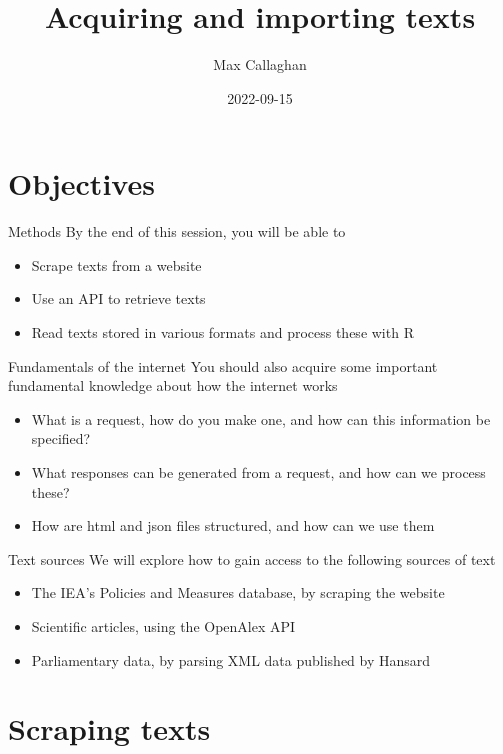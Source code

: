 \documentclass[
  10pt,
  ignorenonframetext,
  aspectratio=169]{beamer}
\title{Acquiring and importing texts}
\author{Max Callaghan}
\date{2022-09-15}
\begin{document}
\frame{\titlepage}

\hypertarget{objectives}{%
\section{Objectives}\label{objectives}}

\begin{frame}{Methods}
\protect\hypertarget{methods}{}
By the end of this session, you will be able to

\begin{itemize}
  \item<1-> Scrape texts from a website
  \item<2-> Use an API to retrieve texts
  \item<3-> Read texts stored in various formats and process these with R
\end{itemize}
\end{frame}

\begin{frame}{Fundamentals of the internet}
\protect\hypertarget{fundamentals-of-the-internet}{}
You should also acquire some important fundamental knowledge about how
the internet works

\begin{itemize}
  \item<1-> What is a request, how do you make one, and how can this information be specified?
  \item<2-> What responses can be generated from a request, and how can we process these?
  \item<3-> How are html and json files structured, and how can we use them
\end{itemize}
\end{frame}

\begin{frame}{Text sources}
\protect\hypertarget{text-sources}{}
We will explore how to gain access to the following sources of text

\begin{itemize}
  \item<1-> The IEA's Policies and Measures database, by scraping the website
  \item<2-> Scientific articles, using the OpenAlex API
  \item<3-> Parliamentary data, by parsing XML data published by Hansard
\end{itemize}
\end{frame}

\hypertarget{scraping-texts}{%
\section{Scraping texts}\label{scraping-texts}}
\end{document}
